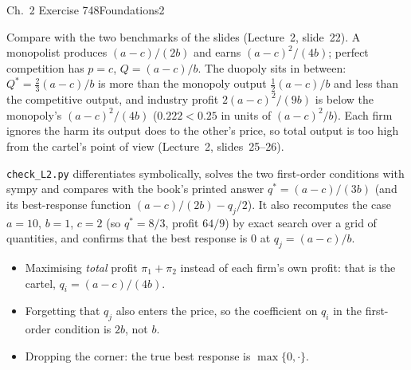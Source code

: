 \begin{exsol}{\MG{} Ch.~2 Exercise 7}{48}{Foundations}{2}

\interp Compare with the two benchmarks of the slides (Lecture~2, slide~22). A monopolist produces
$(a - c)/(2b)$ and earns $(a-c)^2/(4b)$; perfect competition has $p = c$, $Q = (a-c)/b$. The duopoly
sits in between: $Q^* = \tfrac23 (a-c)/b$ is more than the monopoly output $\tfrac12 (a-c)/b$ and less
than the competitive output, and industry profit $2(a-c)^2/(9b)$ is below the monopoly's
$(a-c)^2/(4b)$ ($0.222 < 0.25$ in units of $(a-c)^2/b$). Each firm ignores the harm its output
does to the other's price, so total output is too high from the cartel's point of view
(Lecture~2, slides~25--26).

\verify \texttt{check\_L2.py} differentiates symbolically, solves the two first-order conditions
with sympy and compares with the book's printed answer $q^* = (a-c)/(3b)$ (and its best-response
function $(a - c)/(2b) - q_j/2$). It also recomputes the case $a = 10$, $b = 1$, $c = 2$ (so
$q^* = 8/3$, profit $64/9$) by exact search over a grid of quantities, and confirms that the
best response is $0$ at $q_j = (a-c)/b$.

\mistakes
\begin{itemize}
  \item Maximising \emph{total} profit $\pi_1 + \pi_2$ instead of each firm's own profit: that is
  the cartel, $q_i = (a-c)/(4b)$.
  \item Forgetting that $q_j$ also enters the price, so the coefficient on $q_i$ in the first-order
  condition is $2b$, not $b$.
  \item Dropping the corner: the true best response is $\max\{0, \cdot\}$.
\end{itemize}
\end{exsol}
